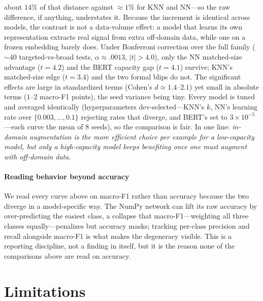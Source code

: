 \documentclass[conference]{IEEEtran}
\begin{document}
about $14\%$ of that distance against ${\approx}1\%$ for KNN and NN---so the
raw difference, if anything, understates it. Because the increment is
identical across models, the contrast is not a data-volume effect: a model that learns its
own representation extracts real signal from extra off-domain data, while
one on a frozen embedding barely does. Under Bonferroni correction over the
full family (${\sim}40$ targeted-vs-broad tests, $\alpha\approx.0013$,
$|t|>4.0$), only the NN matched-size advantage ($t=4.2$) and the BERT
capacity gap ($t=4.1$) survive; KNN's matched-size edge ($t=3.4$) and the
two formal blips do not. The
significant effects are large in standardized terms (Cohen's
$d\approx1.4$--$2.1$) yet small in absolute terms ($1$--$2$ macro-F1
points), the seed variance being tiny. Every model is tuned and averaged
identically (hyperparameters dev-selected---KNN's $k$, NN's learning rate
over $\{0.003,\dots,0.1\}$ rejecting rates that diverge, and BERT's set to
$3\times10^{-5}$---each curve the mean of $8$ seeds), so the comparison is
fair. In one line: \emph{in-domain augmentation is the more efficient
choice per example for a low-capacity model, but only a high-capacity
model keeps benefiting once one must augment with off-domain data.}

\paragraph*{Reading behavior beyond accuracy}
We read every curve above on macro-F1 rather than accuracy because the two
diverge in a model-specific way. The NumPy network can lift its raw
accuracy by over-predicting the easiest class, a collapse that
macro-F1---weighting all three classes equally---penalizes but accuracy
masks; tracking per-class precision and recall alongside macro-F1 is what
makes the degeneracy visible. This is a reporting discipline, not a finding
in itself, but it is the reason none of the comparisons above are read on
accuracy.

\section{Limitations}
\label{sec:limits}
\end{document}
